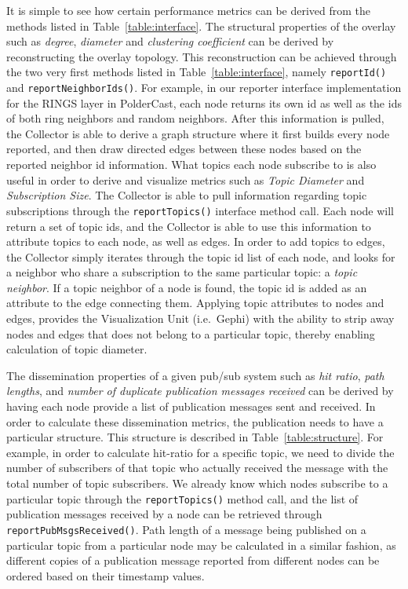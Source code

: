 

It is simple to see how certain performance metrics
can be derived from the methods listed in Table~\ref{table:interface}.
The structural properties of the overlay such as \emph{degree},
\emph{diameter} and \emph{clustering coefficient} can be derived by
reconstructing the overlay topology. This reconstruction can be achieved
through the two very first methods listed in
Table~\ref{table:interface}, namely \texttt{reportId()} and \texttt{reportNeighborIds()}.
For example, in our reporter interface
implementation for the RINGS layer in PolderCast, each node returns its
own id as well as the ids of both ring neighbors and random neighbors.
After this information is pulled, the Collector is able to derive a
graph structure where it first builds every node reported, and then draw
directed edges between these nodes based on the reported neighbor id
information. What topics each node subscribe to is also useful in order
to derive and visualize metrics such as \emph{Topic Diameter} and \emph{Subscription
    Size}. The Collector is able to pull information regarding topic
subscriptions through the \texttt{reportTopics()} interface method call.
Each node will return a set of topic ids, and the Collector is able to
use this information to attribute topics to each node, as well as edges.
In order to add topics to edges, the Collector simply iterates through
the topic id list of each node, and looks for a neighbor who share a
subscription to the same particular topic: a \emph{topic neighbor}. If a
topic neighbor of a node is found, the topic id is added as an attribute
to the edge connecting them. Applying topic attributes to nodes and
edges, provides the Visualization Unit (i.e.\ Gephi) with the ability to strip away
nodes and edges that does not belong to a particular topic, thereby
enabling calculation of topic diameter.

The dissemination properties of a given pub/sub system such as
\emph{hit ratio}, \emph{path lengths}, and \emph{number of duplicate publication
messages received} can be derived by having each node provide a list of
publication messages sent and received. In order to calculate these
dissemination metrics, the publication needs to have a particular
structure. This structure is described in Table~\ref{table:structure}.
For example, in order to calculate hit-ratio for a specific topic, we
need to divide the number of subscribers of that topic who actually
received the message with the total number of topic subscribers. We
already know which nodes subscribe to a particular topic through the
\texttt{reportTopics()} method call, and the list of publication
messages received by a node can be retrieved through
\texttt{reportPubMsgsReceived()}. Path length of a
message being published on a particular topic from a particular node may
be calculated in a similar fashion, as different copies of a publication message reported from
different nodes can be ordered based on their timestamp values.

